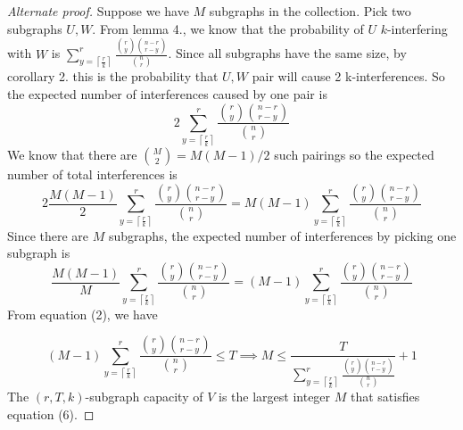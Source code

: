 \documentclass[10pt]{extarticle}
\newtheorem{theorem}{Theorem}
\theoremstyle{definition}
\begin{document}
\begin{proof}[Alternate proof]
    Suppose we have $M$ subgraphs in the collection. Pick two subgraphs $U,W$. From lemma 4., we know that the probability of $U$ $k$-interfering with $W$ is $\sum_{y = \left\lceil \frac{r}{k} \right\rceil}^{r}  \frac{\binom{r}{y} \binom{n-r}{r-y}}{\binom{n}{r}}$. Since all subgraphs have the same size, by corollary 2. this is the probability that $U,W$ pair will cause 2 k-interferences. So the expected number of interferences caused by one pair is
    $$
    2\sum_{y = \left\lceil \frac{r}{k} \right\rceil}^{r}  \frac{\binom{r}{y} \binom{n-r}{r-y}}{\binom{n}{r}} 
    $$
    We know that there are $\binom{M}{2} = M(M-1)/2$ such pairings so the expected number of total interferences is
    $$
    2 \frac{M(M-1)}{2} \sum_{y = \left\lceil \frac{r}{k} \right\rceil}^{r}  \frac{\binom{r}{y} \binom{n-r}{r-y}}{\binom{n}{r}}  =  M(M-1) \sum_{y = \left\lceil \frac{r}{k} \right\rceil}^{r}  \frac{\binom{r}{y} \binom{n-r}{r-y}}{\binom{n}{r}} 
    $$
    Since there are $M$ subgraphs, the expected number of interferences by picking one subgraph is
    $$
    \frac{M(M-1)}{M} \sum_{y = \left\lceil \frac{r}{k} \right\rceil}^{r}  \frac{\binom{r}{y} \binom{n-r}{r-y}}{\binom{n}{r}}  = (M-1) \sum_{y = \left\lceil \frac{r}{k} \right\rceil}^{r}  \frac{\binom{r}{y} \binom{n-r}{r-y}}{\binom{n}{r}} 
    $$
    From equation (2), we have 

    \begin{equation*}
        (M-1) \sum_{y = \left\lceil \frac{r}{k} \right\rceil}^{r}  \frac{\binom{r}{y} \binom{n-r}{r-y}}{\binom{n}{r}}  \le T \implies M \le \frac{T}{\sum_{y = \left\lceil \frac{r}{k} \right\rceil}^{r}  \frac{\binom{r}{y} \binom{n-r}{r-y}}{\binom{n}{r}}} + 1
    \end{equation*}
    The $(r,T,k)$-subgraph capacity of $V$ is the largest integer $M$ that satisfies equation (6).
    
\end{proof}


\end{document}
